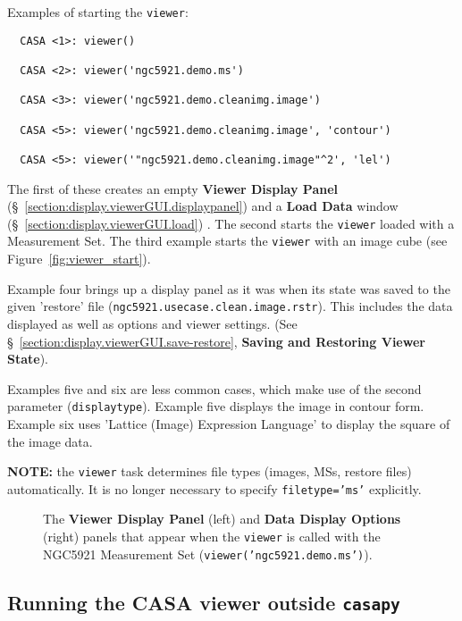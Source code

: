 Examples of starting the {\tt viewer}:
\small
\begin{verbatim}
  CASA <1>: viewer()

  CASA <2>: viewer('ngc5921.demo.ms')

  CASA <3>: viewer('ngc5921.demo.cleanimg.image')

  CASA <5>: viewer('ngc5921.demo.cleanimg.image', 'contour')
  
  CASA <5>: viewer('"ngc5921.demo.cleanimg.image"^2', 'lel')
\end{verbatim}
\normalsize
The first of these creates
an empty {\bf Viewer Display Panel} 
(\S~\ref{section:display.viewerGUI.displaypanel}) and a {\bf Load Data} 
window (\S~\ref{section:display.viewerGUI.load}) .  The second starts the
{\tt viewer} loaded with a Measurement Set.  The third example
starts the {\tt viewer} with an image cube 
(see Figure~\ref{fig:viewer_start}).  

Example four brings up a display panel as it was when its state was saved
to the given 'restore' file ({\tt ngc5921.usecase.clean.image.rstr}).
This includes the data displayed as well as options and viewer
settings.  (See \S~\ref{section:display.viewerGUI.save-restore},
{\bf Saving and Restoring Viewer State}).

Examples five and six are less common cases, which make use of the second
parameter ({\tt displaytype}).  Example five displays the image in contour
form.  Example six uses 'Lattice (Image) Expression Language' to display the
square of the image data.

{\bf NOTE:} the {\tt viewer} task determines file types (images, MSs,
restore files) automatically.  It is no longer necessary to specify
{\tt filetype='ms'} explicitly.

\begin{figure}[h!]
\begin{center}
\caption{\label{fig:viewer_start_ms} The {\bf Viewer Display Panel}
(left) and {\bf Data Display Options} (right) panels that appear when the 
{\tt viewer} is called with the NGC5921 Measurement Set
({\tt viewer('ngc5921.demo.ms')}).} 
\hrulefill
\end{center}
\end{figure}

\subsection{Running the CASA viewer outside {\tt casapy}}
\label{section:display.start.casaviewer}

